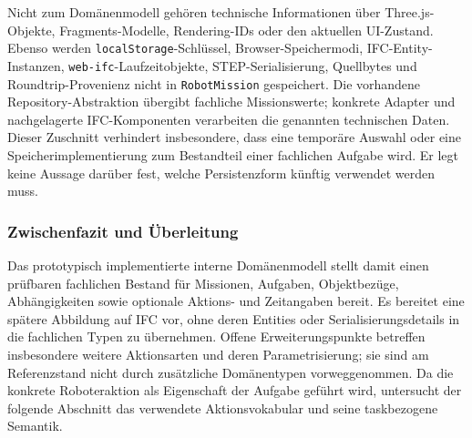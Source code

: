Nicht zum Domänenmodell gehören technische Informationen über Three.js-Objekte, Fragments-Modelle, Rendering-IDs oder
den aktuellen UI-Zustand. Ebenso werden \texttt{localStorage}-Schlüssel, Browser-Speichermodi, IFC-Entity-Instanzen,
\texttt{web-ifc}-Laufzeitobjekte, STEP-Serialisierung, Quellbytes und Roundtrip-Provenienz nicht in
\texttt{RobotMission} gespeichert. Die vorhandene Repository-Abstraktion übergibt fachliche Missionswerte; konkrete
Adapter und nachgelagerte IFC-Komponenten verarbeiten die genannten technischen Daten. Dieser Zuschnitt verhindert
insbesondere, dass eine temporäre Auswahl oder eine Speicherimplementierung zum Bestandteil einer fachlichen Aufgabe
wird. Er legt keine Aussage darüber fest, welche Persistenzform künftig verwendet werden muss.

\subsubsection{Zwischenfazit und Überleitung}

Das prototypisch implementierte interne Domänenmodell stellt damit einen prüfbaren fachlichen Bestand für Missionen,
Aufgaben, Objektbezüge, Abhängigkeiten sowie optionale Aktions- und Zeitangaben bereit. Es bereitet eine spätere
Abbildung auf IFC vor, ohne deren Entities oder Serialisierungsdetails in die fachlichen Typen zu übernehmen. Offene
Erweiterungspunkte betreffen insbesondere weitere Aktionsarten und deren Parametrisierung; sie sind am Referenzstand
nicht durch zusätzliche Domänentypen vorweggenommen. Da die konkrete Roboteraktion als Eigenschaft der Aufgabe geführt
wird, untersucht der folgende Abschnitt das verwendete Aktionsvokabular und seine taskbezogene Semantik.
